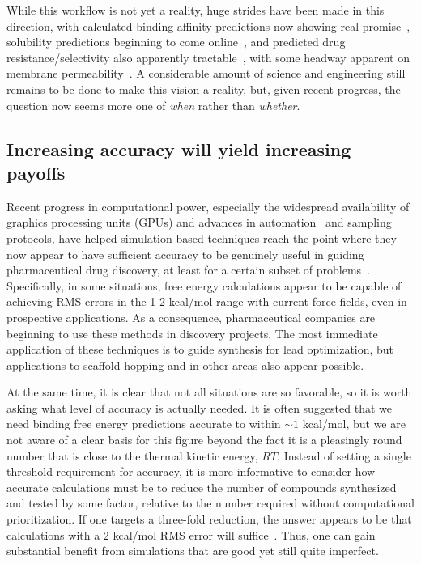 \documentclass[aps,pre,twocolumn,nofootinbib,superscriptaddress,10pt, final,tightenlines]{revtex4-1}
\begin{document}
While this workflow is not yet a reality, huge strides have been made in this direction, with calculated binding affinity predictions now showing real promise~\cite{mobley_perspective_2012, christ_accuracy_2014, deng_distinguishing_2015, Sherborne:2016:JComputAidedMolDes, schrodinger_accurate_2015, christ_binding_2016, cui_affinity_2016, verras_free_2016}, solubility predictions beginning to come online~\cite{Schnieders:2012:J.Chem.TheoryComput., park_absolute_2014, liu_using_2016}, and predicted drug resistance/selectivity also apparently tractable~\cite{leonis_contribution_2013, leonis_contribution_2013}, with some headway apparent on membrane permeability~\cite{lee_permeability_2016, comer_permeability_2014}. 
A considerable amount of science and engineering still remains to be done to make this vision a reality, but, given recent progress, the question now seems more one of \emph{when} rather than \emph{whether}. 

\subsection{Increasing accuracy will yield increasing payoffs}

Recent progress in computational power, especially the widespread availability of graphics processing units (GPUs) and advances in automation~\cite{liu_lead_2013} and sampling protocols, have helped simulation-based techniques reach the point where they now appear to have sufficient accuracy to be genuinely useful in guiding pharmaceutical drug discovery, at least for a certain subset of problems~\cite{mikulskis_large-scale_2014, homeyer_binding_2014, Sherborne:2016:JComputAidedMolDes,  schrodinger_accurate_2015, christ_binding_2016, cui_affinity_2016, verras_free_2016}.
Specifically, in some situations, free energy calculations appear to be capable of achieving RMS errors in the 1-2 kcal/mol range with current force fields, even in prospective applications.
As a consequence, pharmaceutical companies are beginning to use these methods in discovery projects. 
The most immediate application of these techniques is to guide synthesis for lead optimization, but applications to scaffold hopping and in other areas also appear possible.

At the same time, it is clear that not all situations are so favorable, so it is worth asking what level of accuracy is actually needed. 
It is often suggested that we need binding free energy predictions accurate to within $\sim 1$ kcal/mol, but we are not aware of a clear basis for this figure beyond the fact it is a pleasingly round number that is close to the thermal kinetic energy, $RT$. 
Instead of setting a single threshold requirement for accuracy, it is more informative to consider how accurate calculations must be to reduce the number of compounds synthesized and tested by some factor, relative to the number required without computational prioritization. 
If one targets a three-fold reduction, the answer appears to be that calculations with a 2 kcal/mol RMS error will suffice~\cite{shirts_free-energy_2010, mobley_perspective_2012}. 
Thus, one can gain substantial benefit from simulations that are good yet still quite imperfect.
\end{document}
